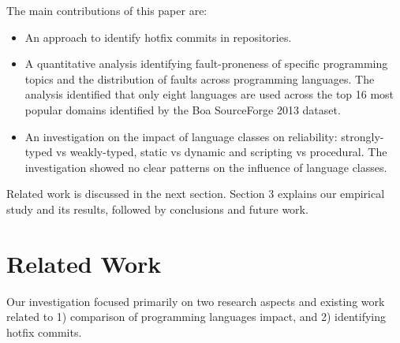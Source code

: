 \documentclass{sig-alternate}
\begin{document}
The main contributions of this paper are:
%
\begin{itemize}
  \item An  approach to identify hotfix commits in repositories.
  \item A quantitative analysis identifying fault-proneness of specific programming topics and the distribution of faults across programming languages. The analysis identified that only eight languages are used across the top 16 most popular domains identified by the Boa SourceForge 2013 dataset.
  \item An investigation on the impact of language classes on reliability: strongly-typed vs weakly-typed, static vs dynamic and scripting vs procedural. The investigation showed no clear patterns on the influence of language classes.
\end{itemize}
%
Related work is discussed in the next section. Section 3 explains our empirical study and its results, followed by conclusions and future work.

\section{Related Work}

Our investigation focused primarily on two research aspects and existing work related to 1) comparison of programming languages impact, and 2) identifying hotfix commits.


\end{document}
